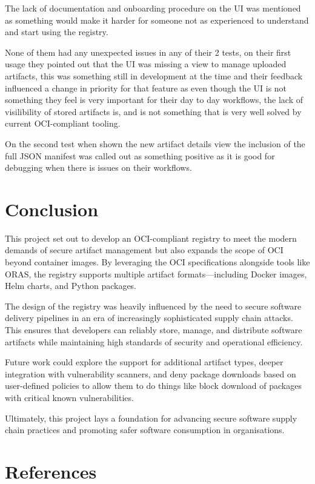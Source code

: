 \documentclass{article}
\begin{document}
  The lack of documentation and onboarding procedure on the UI was mentioned as something would make it harder for someone not as experienced to understand and start using the registry.  

  None of them had any unexpected issues in any of their 2 tests, on their first usage they pointed out that the UI was missing a view to manage uploaded artifacts, this was something still in development at the time and their feedback influenced a change in priority for that feature as even though the UI is not something they feel is very important for their day to day workflows, the lack of visilibility of stored artifacts is, and is not something that is very well solved by current OCI-compliant tooling.

  On the second test when shown the new artifact details view the inclusion of the full JSON manifest was called out as something positive as it is good for debugging when there is issues on their workflows.

  \section{Conclusion}

  This project set out to develop an OCI-compliant registry to meet the modern demands of secure artifact management but also expands the scope of OCI beyond container images. 
  By leveraging the OCI specifications alongside tools like ORAS, the registry supports multiple artifact formats—including Docker images, Helm charts, and Python packages.

  The design of the registry was heavily influenced by the need to secure software delivery pipelines in an era of increasingly sophisticated supply chain attacks. This ensures that developers can reliably store, manage, and distribute software artifacts while maintaining high standards of security and operational efficiency.

  Future work could explore the support for additional artifact types, deeper integration with vulnerability scanners, and deny package downloads based on user-defined policies to allow them to do things like block download of packages with critical known vulnerabilities.
  
  Ultimately, this project lays a foundation for advancing secure software supply chain practices and promoting safer software consumption in organisations.

  \newpage

  \section{References}
\end{document}
